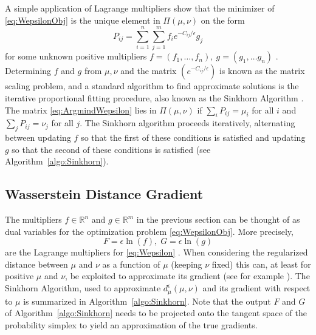 \documentclass[conference]{IEEEtran}
\newcommand{\R}{{\mathbb{R}}}
\begin{document}
A simple application of Lagrange multipliers show that the minimizer of \eqref{eq:WepsilonObj} is the unique element in $\Pi(\mu,\nu)$ on the form
\begin{equation} P_{ij} = \sum_{i=1}^n \sum_{j=1}^m f_i e^{-C_{ij}/\epsilon} g_j \label{eq:ArgmindWepsilon} \end{equation}
for some unknown positive multipliers $f=(f_1,\ldots,f_n),\ g=(g_1,\ldots g_n)$ \cite{peyre}. Determining $f$ and $g$ from $\mu, \nu$ and the matrix $(e^{-C_{ij}/\epsilon})$ is known as the matrix scaling problem, and a standard algorithm to find approximate solutions is the iterative proportional fitting procedure, also known as the Sinkhorn Algorithm \cite{peyre}. The matrix \eqref{eq:ArgmindWepsilon} lies in $\Pi(\mu,\nu)$ if $\sum_i P_{ij} = \mu_i$ for all $i$ and $\sum_j P_{ij} = \nu_j$ for all $j$. The Sinkhorn algorithm proceeds iteratively, alternating between updating $f$ so that the first of these conditions is satisfied and updating  $g$ so that the second of these conditions is satisfied (see Algorithm~\ref{algo:Sinkhorn}).

\subsection{Wasserstein Distance Gradient}
The multipliers $f\in\R^n$ and $g\in\R^m$ in the previous section can be thought of as dual variables for the optimization problem \eqref{eq:WepsilonObj}. More precisely, 
$$ F = \epsilon \ln(f), \; G = \epsilon \ln(g) $$ 
are the Lagrange multipliers for \eqref{eq:Wepsilon} \cite{cuturi}. When considering the regularized distance between $\mu$ and $\nu$ as a function of $\mu$ (keeping $\nu$ fixed) this can, at least for positive $\mu$ and $\nu$, be exploited to approximate its gradient (see for example \cite{frogner, lellman}). The Sinkhorn Algorithm, used to approximate $d_\mu^\epsilon(\mu,\nu)$ and its gradient with respect to $\mu$ is summarized in Algorithm~\ref{algo:Sinkhorn}. Note that the output $F$ and $G$ of Algorithm~\ref{algo:Sinkhorn} needs to be projected onto the tangent space of the probability simplex to yield an approximation of the true gradients. 
\end{document}
